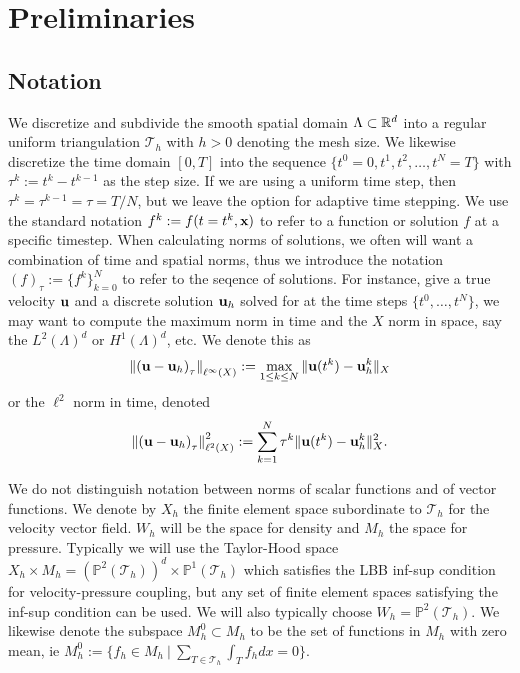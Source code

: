\documentclass[letterpaper]{erdc}
\begin{document}
%
%
%
\section{Preliminaries}


%
%
\subsection{Notation}
We discretize and subdivide the smooth spatial domain $\Lambda\subset \mathbb{R}^d$ into a regular uniform triangulation $\mathcal{T}_h$ with $h>0$ denoting the mesh size.  We likewise discretize the time domain $[0,T]$ into the sequence $\{ t^0=0, t^1, t^2, \dots, t^N = T\}$  with $\tau^k:= t^k-t^{k-1}$ as the step size.  If we are using a uniform time step, then $\tau^k = \tau^{k-1} = \tau = T/N$, but we leave the option for adaptive time stepping.  We use the standard notation $f^{k} := f(t=t^k,\textbf{x})$ to refer to a function or solution $f$ at a specific timestep.  When calculating norms of solutions, we often will want a combination of time and spatial norms,  thus we introduce the notation $\left( f \right)_{\tau}:= \{ f^k \}_{k=0}^{N}$ to refer to the seqence of solutions.  For instance, give a true velocity $\textbf{u}$ and a discrete solution $\textbf{u}_h$ solved for at the time steps $\{t^0,\dots, t^{N}\}$, we may want to compute the maximum norm in time and the $X$ norm in space, say the $L^2(\Lambda)^d$ or $H^1(\Lambda)^d$, etc.  We denote this as
\begin{equation}
  \left\| \left( \textbf{u} - \textbf{u}_h \right)_{\tau} \right\|_{\ell^{\infty}(X)} := \max_{1\leq k \leq N} \| \textbf{u}(t^{k}) - \textbf{u}_h^{k}\|_{X}
\end{equation}
or the $\ell^2$ norm in time, denoted
\begin{equation}
  \left\| \left( \textbf{u} - \textbf{u}_h \right)_{\tau} \right\|^2_{\ell^{2}(X)} :=  \sum_{k=1}^{N} \tau^{k}\| \textbf{u}(t^{k}) - \textbf{u}_h^{k}\|^2_{X}.
\end{equation}

We do not distinguish notation between norms of scalar functions and of vector functions.  We denote by $X_h$ the finite element space subordinate to $\mathcal{T}_h$ for the velocity vector field.  $W_h$ will be the space for density and $M_h$ the space for pressure.  Typically we will use the Taylor-Hood space $X_h \times M_h = \left(\mathbb{P}^2\left(\mathcal{T}_h\right)\right)^d\times \mathbb{P}^1\left(\mathcal{T}_h\right)$ which satisfies the LBB inf-sup condition for velocity-pressure coupling, but any set of finite element spaces satisfying the inf-sup condition can be used.  We will also typically choose $W_h = \mathbb{P}^2\left(\mathcal{T}_h\right)$.  We likewise denote the subspace $M_h^0\subset M_h$ to be the set of functions in $M_h$ with zero mean, ie $M_h^0 := \{ f_h\in M_h \:|\: \sum_{T\in\mathcal{T}_h}\int_{T}f_h dx = 0\}$.
\end{document}

